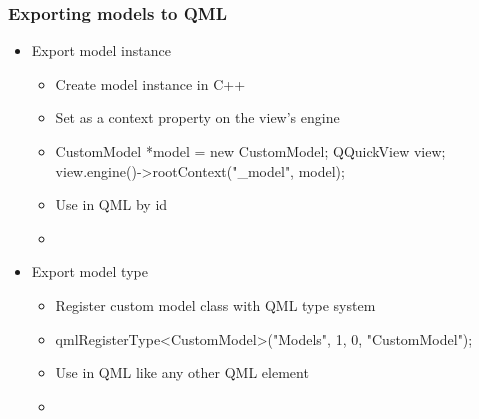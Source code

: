 \begin{slide}[fragile]{}\frametitle{Exporting models to QML}
  \begin{itemize}
    \item Export model instance
    \begin{itemize}
        \item Create model instance in C++
        \item Set as a context property on the view's engine
        \item[]
        \begin{cpp}
CustomModel *model = new CustomModel;        
QQuickView view;
view.engine()->rootContext("_model", model);
        \end{cpp}
        \item Use in QML by id
        \item[]
        \begin{qml}
\\
        \end{qml}
    \end{itemize}
    \vspace*{1.0em}
    \item Export model type
    \begin{itemize}
        \item Register custom model class with QML type system
        \item[]
        \begin{cpp}
qmlRegisterType<CustomModel>("Models", 1, 0, "CustomModel");        
        \end{cpp}
        \item Use in QML like any other QML element
        \item[]
        \begin{qml}
\\
\\
\\
\qtt{\}}\\
        \end{qml}
    \end{itemize}
  \end{itemize}
\end{slide}

